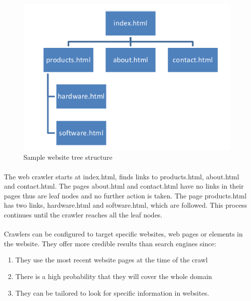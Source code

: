 \begin{figure}[H]
	\includegraphics[width=\linewidth,scale=0.5]{../static/img/webtree.png}
	\caption{Sample website tree structure}
\end{figure}

\paragraph{}
The web crawler starts at index.html, finds links to products.html, about.html and contact.html. The pages about.html and contact.html have no links in their pages thus are leaf nodes and no further action is taken. The page products.html has two links, hardware.html and software.html, which are followed. This process continues until the crawler reaches all the leaf nodes.
\paragraph{}
Crawlers can be configured to target specific websites, web pages or elements in the website. They offer more credible results than search engines since:
\begin{enumerate}
\item They use the most recent website pages at the time of the crawl
\item There is a high probability that they will cover the whole domain
\item They can be tailored to look for specific information in websites.
\end{enumerate}

